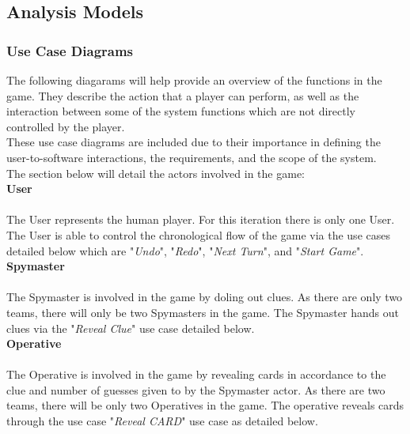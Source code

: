 \documentclass[10pt, a4paper]{article}
\begin{document}
	\subsection{Analysis Models}
	
		\subsubsection{Use Case Diagrams}
		
		The following diagarams will help provide an overview of the functions in the game. They describe the action that a player can perform, as well as the interaction between some of the system functions which are not directly controlled by the player.\\
		
		These use case diagrams are included due to their importance in defining the user-to-software interactions, the requirements, and the scope of the system.\\
		
		The section below will detail the actors involved in the game: \\
		    
		    \textbf{User} \\
		    \\
		    The User represents the human player. For this iteration there is only one User. The User is able to control the chronological flow of the game via the use cases detailed below which are "\textit{Undo}", "\textit{Redo}", "\textit{Next Turn}", and "\textit{Start Game}".\\
		    
		    \textbf{Spymaster}\\
		    \\
		    The Spymaster is involved in the game by doling out clues. As there are only two teams, there will only be two Spymasters in the game. The Spymaster hands out clues via the "\textit{Reveal Clue}" use case detailed below.\\
		    
		    \textbf{Operative}\\
		    \\
		    The Operative is involved in the game by revealing cards in accordance to the clue and number of guesses given to by the Spymaster actor. As there are two teams, there will be only two Operatives in the game. The operative reveals cards through the use case "\textit{Reveal CARD}" use case as detailed below.\\
		    
\end{document}
